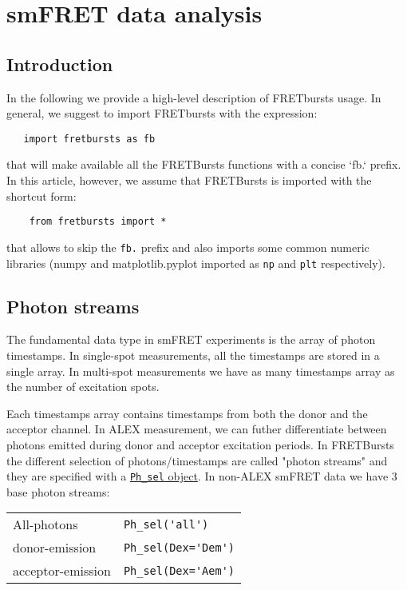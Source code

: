 \section{smFRET data analysis}

\subsection{Introduction}

In the following we provide a high-level description of FRETbursts usage. In general, we suggest to import FRETbursts with the expression:

\begin{verbatim}
   import fretbursts as fb
\end{verbatim}


that will make available all the FRETBursts functions with a concise `fb.` prefix. In this article, however, we assume that FRETBursts is imported with the shortcut form:

\begin{verbatim}
    from fretbursts import *
\end{verbatim}

that allows to skip the \verb|fb.| prefix and also imports some common numeric libraries (numpy and matplotlib.pyplot imported as \verb|np| and \verb|plt| respectively).

\subsection{Photon streams}

The fundamental data type in smFRET experiments is the array of photon timestamps. In single-spot measurements, all the timestamps are stored in a single array. In multi-spot measurements we have as many timestamps array as the number of excitation spots.

Each timestamps array contains timestamps from both the donor and the acceptor channel. In ALEX measurement, we can futher differentiate between photons emitted during donor and acceptor excitation periods. In FRETBursts the different selection of photons/timestamps are called "photon streams" and they are specified with a \href{http://fretbursts.readthedocs.org/en/latest/data_class.html#module-fretbursts.ph_sel}{\verb|Ph_sel| object}. In non-ALEX smFRET data we have 3 base photon streams: 

\begin{tabular}{l l}
  All-photons       & \verb|Ph_sel('all')|\\
  donor-emission    & \verb|Ph_sel(Dex='Dem')|\\
  acceptor-emission & \verb|Ph_sel(Dex='Aem')|\\
\end{tabular}

